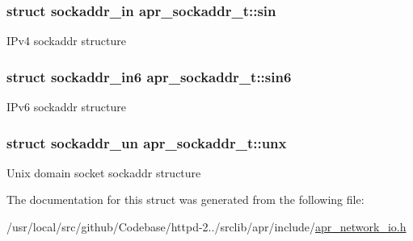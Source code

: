 \subsubsection[{\texorpdfstring{sin}{sin}}]{\setlength{\rightskip}{0pt plus 5cm}struct sockaddr\+\_\+in apr\+\_\+sockaddr\+\_\+t\+::sin}\hypertarget{structapr__sockaddr__t_a7d5cf0290260c3c448360fc819b28714}{}\label{structapr__sockaddr__t_a7d5cf0290260c3c448360fc819b28714}
I\+Pv4 sockaddr structure 
\subsubsection[{\texorpdfstring{sin6}{sin6}}]{\setlength{\rightskip}{0pt plus 5cm}struct sockaddr\+\_\+in6 apr\+\_\+sockaddr\+\_\+t\+::sin6}\hypertarget{structapr__sockaddr__t_ab3a1f900d2a1e58d337a61d99e94d3f9}{}\label{structapr__sockaddr__t_ab3a1f900d2a1e58d337a61d99e94d3f9}
I\+Pv6 sockaddr structure 
\subsubsection[{\texorpdfstring{unx}{unx}}]{\setlength{\rightskip}{0pt plus 5cm}struct sockaddr\+\_\+un apr\+\_\+sockaddr\+\_\+t\+::unx}\hypertarget{structapr__sockaddr__t_ab70adff74895539a7e6cc9cba74c2673}{}\label{structapr__sockaddr__t_ab70adff74895539a7e6cc9cba74c2673}
Unix domain socket sockaddr structure 

The documentation for this struct was generated from the following file\+:\begin{DoxyCompactItemize}
\item 
/usr/local/src/github/\+Codebase/httpd-\/2../srclib/apr/include/\hyperlink{apr__network__io_8h}{apr\+\_\+network\+\_\+io.\+h}\end{DoxyCompactItemize}
